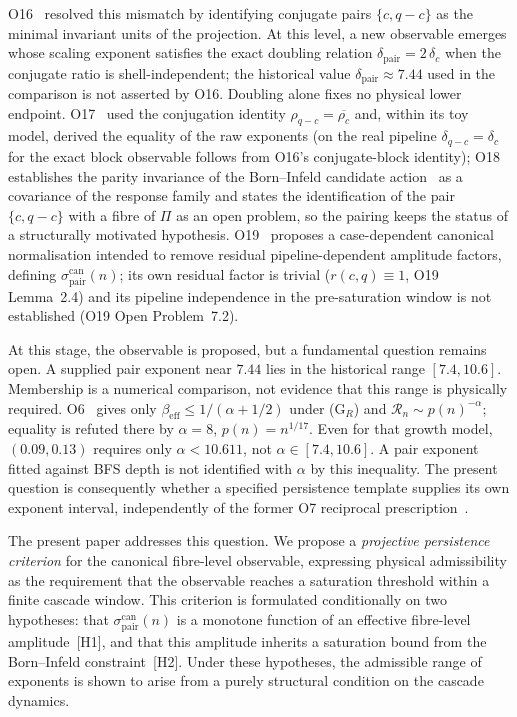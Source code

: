 \documentclass[11pt,a4paper]{article}
\theoremstyle{definition}
\theoremstyle{remark}
\begin{document}
    O16~\cite{Beau2026a20} resolved this mismatch by identifying
    conjugate pairs $\{c, q-c\}$ as the minimal invariant units of the
    projection.
    At this level, a new observable emerges whose scaling exponent
    satisfies the exact doubling relation
    $\delta_{\mathrm{pair}} = 2\,\delta_c$ when the conjugate ratio is shell-independent;
    the historical value $\delta_{\mathrm{pair}} \approx7.44$ used in the comparison is not
    asserted by O16.
    Doubling alone fixes no physical lower endpoint.
    O17~\cite{Beau2026a21} used the conjugation identity $\rho_{q-c} = \overline{\rho_c}$ and, within
    its toy model, derived the equality of the raw exponents (on the real pipeline
    $\delta_{q-c} = \delta_c$ for the exact block observable follows from O16's conjugate-block
    identity); O18~\cite{Beau2026a22} establishes the parity invariance of
    the Born--Infeld candidate action~\cite{Beau2026c} as a covariance of the response family and states
    the identification of the pair $\{c, q-c\}$ with a fibre of $\Pi$ as an open problem,
    so the pairing keeps the status of a structurally motivated hypothesis.
    O19~\cite{Beau2026a23} proposes a case-dependent canonical normalisation intended to
    remove residual pipeline-dependent amplitude factors, defining
    $\sigma_{\mathrm{pair}}^{\mathrm{can}}(n)$; its own residual factor is trivial ($r(c,q)\equiv1$, O19 Lemma~2.4) and its
    pipeline independence in the pre-saturation window is not established (O19 Open Problem~7.2).

    At this stage, the observable is proposed, but a fundamental question
    remains open.
    A supplied pair exponent near $7.44$ lies in the historical range $[7.4,10.6]$.
    Membership is a numerical comparison, not evidence that this range is physically required.
    O6~\cite{Beau2026a10} gives only $\beta_{\mathrm{eff}}\leq1/(\alpha+1/2)$ under (G$_R$)
    and $\mathcal R_n\sim p(n)^{-\alpha}$; equality is refuted there by
    $\alpha=8$, $p(n)=n^{1/17}$.
    Even for that growth model, $(0.09,0.13)$ requires only $\alpha<10.611$,
    not $\alpha\in[7.4,10.6]$.
    A pair exponent fitted against BFS depth is not identified with $\alpha$ by this inequality.
    The present question is consequently whether a specified persistence template supplies its own
    exponent interval, independently of the former O7 reciprocal prescription~\cite{Beau2026a11}.

    The present paper addresses this question.
    We propose a \emph{projective persistence criterion} for the
    canonical fibre-level observable, expressing physical admissibility
    as the requirement that the observable reaches a saturation
    threshold within a finite cascade window.
    This criterion is formulated conditionally on two hypotheses:
    that $\sigma_{\mathrm{pair}}^{\mathrm{can}}(n)$ is a monotone
    function of an effective fibre-level amplitude~[H1], and that this
    amplitude inherits a saturation bound from the Born--Infeld
    constraint~[H2].
    Under these hypotheses, the admissible range of exponents is shown
    to arise from a purely structural condition on the cascade dynamics.
\end{document}

